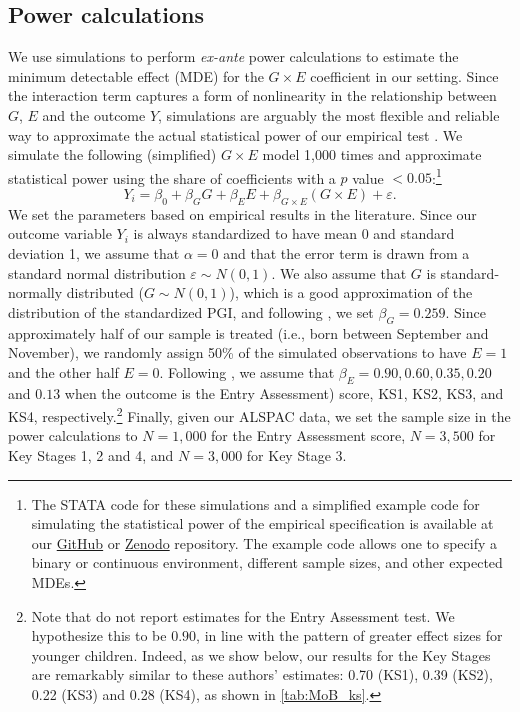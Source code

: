 \documentclass[12pt,a4paper]{article}
\begin{document}
\begin{bibunit}
\subsection{Power calculations}
\label{powercalculationsapp}
We use simulations to perform \textit{ex-ante} power calculations to estimate the minimum detectable effect (MDE) for the $G \times E$ coefficient in our setting. Since the interaction term captures a form of nonlinearity in the relationship between $G$, $E$ and the outcome $Y$, simulations are arguably the most flexible and reliable way to approximate the actual statistical power of our empirical test \citep{Duncan2011}. We simulate the following (simplified) $G \times E$ model 1,000 times and approximate statistical power using the share of coefficients with a $p$ value $<0.05$:\footnote{The STATA code for these simulations and a simplified example code for simulating the statistical power of the empirical specification is available at our \href{http://github.com/geighei/GxE_4practitioners}{GitHub} or \href{https://zenodo.org/records/14968164}{Zenodo} repository. The example code allows one to specify a binary or continuous environment, different sample sizes, and other expected MDEs.}
%
\begin{equation} \label{eq:power}
    Y_i = \beta_0 + \beta_G G + \beta_E E + \beta_{G \times E} (G \times E) + \varepsilon.
\end{equation}
We set the parameters based on empirical results in the literature. Since our outcome variable $Y_i$ is always standardized to have mean 0 and standard deviation 1, we assume that $\alpha=0$ and that the error term is drawn from a standard normal distribution $\varepsilon \sim N(0,1)$. We also assume that $G$ is standard-normally distributed ($G \sim N(0,1)$), which is a good approximation of the distribution of the standardized PGI, and following \cite{Allegrini2019}, we set $\beta_G=0.259$.
Since approximately half of our sample is treated (i.e., born between September and November), we randomly assign 50\% of the simulated observations to have $E=1$ and the other half $E=0$. Following \cite{Crawford2010}, we assume that $\beta_E=0.90, 0.60, 0.35, 0.20$ and $0.13$ when the outcome is the Entry Assessment) score, KS1, KS2, KS3, and KS4, respectively.\footnote{Note that \cite{Crawford2010} do not report estimates for the Entry Assessment test. We hypothesize this to be $0.90$, in line with the pattern of greater effect sizes for younger children. Indeed, as we show below, our results for the Key Stages are remarkably similar to these authors' estimates: 0.70 (KS1), 0.39 (KS2), 0.22 (KS3) and 0.28 (KS4), as shown in \autoref{tab:MoB_ks}.} Finally, given our ALSPAC data, we set the sample size in the power calculations to $N=1,000$ for the Entry Assessment score, $N=3,500$ for Key Stages 1, 2 and 4, and $N=3,000$ for Key Stage 3.


\end{bibunit}
\end{document}
